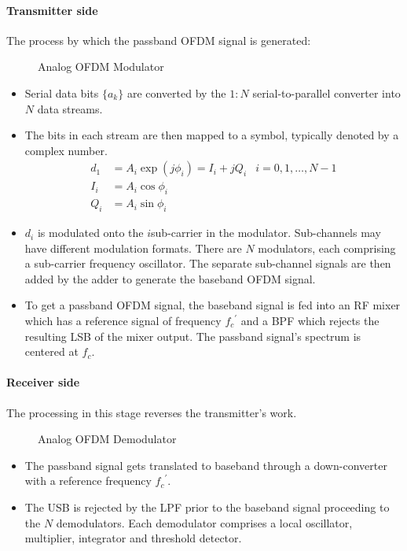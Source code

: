 \paragraph{Transmitter side} The process by which the passband OFDM signal is generated:
\begin{figure}[!h]
	\centering
	\resizebox{\textwidth}{!}{
		
	}
	\caption{Analog OFDM Modulator}
\end{figure}
\begin{itemize}
	\item Serial data bits \(\{a_k\}\) are converted by the \(1:N\) serial-to-parallel converter into \(N\) data streams.
	\item The bits in each stream are then mapped to a symbol, typically denoted by a complex number.
		\begin{align}
			d_1 &= A_i \exp (j\phi_i) = I_i + jQ_i & i = 0,1,\ldots, N-1 \\
			I_i &= A_i \cos \phi_i\nonumber \\
			Q_i &= A_i \sin \phi_i\nonumber
		\end{align}
		\begin{mathDef}
		\end{mathDef}
	\item \(d_i\) is modulated onto the \(i\)\nth sub-carrier in the modulator. Sub-channels may have different modulation formats. There are \(N\) modulators, each comprising a sub-carrier frequency oscillator. The separate sub-channel signals are then added by the adder to generate the baseband OFDM signal.
	\item To get a passband OFDM signal, the baseband signal is fed into an RF mixer which has a reference signal of frequency \({f_c}^\prime\) and a \gls{BPF} which rejects the resulting \gls{LSB} of the mixer output. The passband signal's spectrum is centered at \(f_c\).
\end{itemize}

\paragraph{Receiver side} The processing in this stage reverses the transmitter's work\cite{ofdm_intro}.
\begin{figure}[!h]
	\centering
	\resizebox{\textwidth}{!}{
		
	}
	\caption{Analog OFDM Demodulator}
\end{figure}
\begin{itemize}
	\item The passband signal gets translated to baseband through a down-converter with a reference frequency \({f_c}^\prime\).
	\item The \gls{USB} is rejected by the \gls{LPF} prior to the baseband signal proceeding to the \(N\) demodulators. Each demodulator comprises a local oscillator, multiplier, integrator and threshold detector.
\end{itemize}

